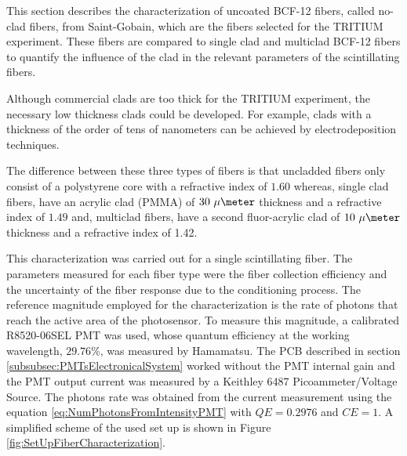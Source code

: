 This section describes the characterization of uncoated BCF-12 fibers, called no-clad fibers, from Saint-Gobain, which are the fibers selected for the TRITIUM experiment. These fibers are compared to single clad and multiclad BCF-12 fibers to quantify the influence of the clad in the relevant parameters of the scintillating fibers.

Although commercial clads are too thick for the TRITIUM experiment, the necessary low thickness clads could be developed. For example, clads with a thickness of the order of tens of nanometers can be achieved by electrodeposition techniques.

The difference between these three types of fibers is that uncladded fibers only consist of a polystyrene core with a refractive index of $1.60$ whereas, single clad fibers, have an acrylic clad (PMMA) of $30~\mu\meter$ thickness and a refractive index of $1.49$ and, multiclad fibers, have a second fluor-acrylic clad of $10~\mu\meter$ thickness  and a refractive index of 1.42.




This characterization was carried out for a single scintillating fiber. The parameters measured for each fiber type were the fiber collection efficiency and the uncertainty of the fiber response due to the conditioning process. The reference magnitude employed for the characterization is the rate of photons that reach the active area of the photosensor. To measure this magnitude, a calibrated R8520-06SEL PMT was used, whose quantum efficiency at the working wavelength, $29.76\%$, was measured by Hamamatsu. The PCB described in section \ref{subsubsec:PMTsElectronicalSystem} worked without the PMT internal gain and the PMT output current was measured by a Keithley 6487 Picoammeter/Voltage Source. The photons rate was obtained from the current measurement using the equation \ref{eq:NumPhotonsFromIntensityPMT} with $QE=0.2976$ and $CE=1$. A simplified scheme of the used set up is shown in Figure \ref{fig:SetUpFiberCharacterization}.

